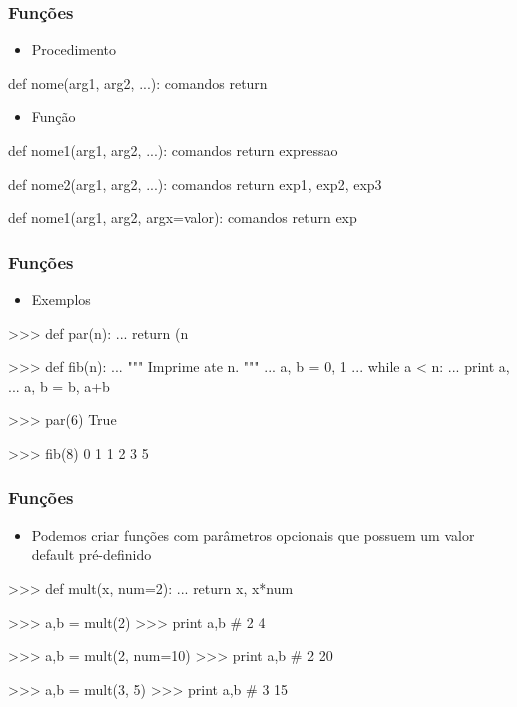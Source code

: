 \documentclass[12pt,t,graphics]{beamer}
\newcommand{\ft}[1]{\frametitle{#1}}
\newcommand{\bi}{\begin{itemize}}
\newcommand{\ei}{\end{itemize}}
\begin{document}

\begin{frame}[fragile]
  \ft{Funções}
  \bi
\item Procedimento
  \ei
  \begin{python}
def nome(arg1, arg2, ...):
    comandos
    return
  \end{python}	
  \bi
\item Função
  \ei
  \begin{python}
def nome1(arg1, arg2, ...):
    comandos
    return expressao
    
def nome2(arg1, arg2, ...):
    comandos
    return exp1, exp2, exp3

def nome1(arg1, arg2, argx=valor):
    comandos
    return exp
  \end{python}	
\end{frame}


\begin{frame}[fragile]
  \ft{Funções}
  \bi
\item Exemplos
  \ei
  \begin{python}
>>> def par(n):
...     return (n %

>>> def fib(n):
...     """ Imprime ate n. """
...     a, b = 0, 1
...     while a < n:
...         print a,
 ...         a, b = b, a+b

>>> par(6) 
True

>>> fib(8) 
0 1 1 2 3 5
  \end{python}	
\end{frame}


\begin{frame}[fragile]
  \ft{Funções}
  \bi
\item Podemos criar funções com parâmetros opcionais
  que possuem um valor default pré-definido
  \ei
  \begin{python}
>>> def mult(x, num=2):
...     return x, x*num

>>> a,b = mult(2)
>>> print a,b # 2 4

>>> a,b = mult(2, num=10)
>>> print a,b # 2 20

>>> a,b = mult(3, 5)
>>> print a,b # 3 15
  \end{python}
\end{frame}
\end{document}
